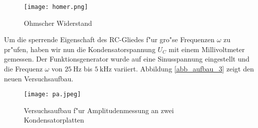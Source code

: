 \documentclass{scrartcl}
\begin{document}
			\begin{figure}[ht]
				\centering
				\texttt{[image: homer.png]}
					\caption {Ohmscher Widerstand}
			\end{figure}

			Um die sperrende Eigenschaft des RC-Gliedes f"ur gro"se Frequenzen $\omega$ zu pr"ufen, haben wir nun die Kondensatorspannung $U_C$ mit einem Millivoltmeter gemessen.
			Der Funktions\-generator wurde auf eine Sinusspannung eingestellt und die Frequenz $\omega$ von $\SI{25}{\hertz}$ bis $\SI{5}{\kilo\hertz}$ variiert. Abbildung \ref{abb_aufbau_3} zeigt den neuen Versuchsaufbau.

			\begin{figure}[ht]
				\centering
				\texttt{[image: pa.jpeg]}
					\caption {Versuchsaufbau f"ur Amplitudenmessung an zwei Kondensatorplatten}
			\end{figure}
\end{document}
